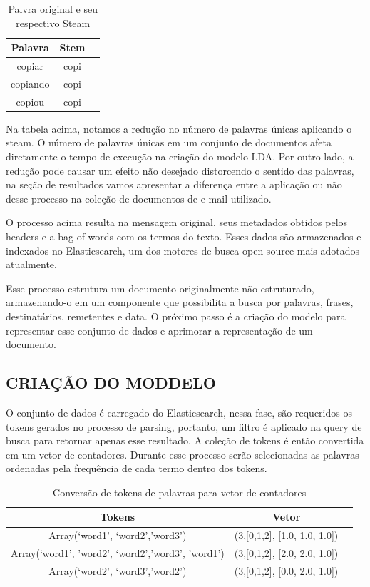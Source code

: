 \documentclass[12pt,a4paper]{article}
\begin{document}
\begin{enumerate}
  
  \begin{table}[h]
    \centering
    \begin{tabular}{c c c}
    Palavra		&Stem &\\
    \hline
    copiar		&copi &\\
    copiando		&copi &\\
    copiou		&copi &\\
    \hline
    \end{tabular}
    \caption{Palvra original e seu respectivo Steam}
  \end{table}
  
  Na tabela acima, notamos a redução no número de palavras únicas aplicando o steam. O número de palavras únicas em um conjunto de documentos afeta diretamente o tempo de execução na criação do modelo LDA. Por outro lado, a redução pode causar um efeito não desejado distorcendo o sentido das palavras, na seção de resultados vamos apresentar a diferença entre a aplicação ou não desse processo na coleção de documentos de e-mail utilizado.
  \end{enumerate}
  
  O processo acima resulta na mensagem original, seus metadados obtidos pelos headers e a bag of words com os termos do texto. Esses dados são armazenados e indexados no Elasticsearch, um dos motores de busca open-source mais adotados atualmente.
  
    Esse processo estrutura um documento originalmente não estruturado, armazenando-o em um componente que possibilita a busca por palavras, frases, destinatários, remetentes e data. O próximo passo é a criação do modelo para representar esse conjunto de dados e aprimorar a representação de um documento.
  
  
  
  \subsection{CRIAÇÃO DO MODDELO}
  O conjunto de dados é carregado do Elasticsearch, nessa fase, são requeridos os tokens gerados no processo de parsing, portanto, um filtro é aplicado na query de busca para retornar apenas esse resultado. A coleção de tokens é então convertida em um vetor de contadores. Durante esse processo serão selecionadas as palavras ordenadas pela frequência de cada termo dentro dos tokens.
  
  
  \begin{table}[h]
    \centering
    \begin{tabular}{c c c}
    Tokens		&Vetor &\\
    \hline
    Array(‘word1’, ‘word2’,’word3’)						&(3,[0,1,2], [1.0, 1.0, 1.0]) &\\
    Array(‘word1’, ’word2’, ‘word2’,’word3’, ’word1’)		&(3,[0,1,2], [2.0, 2.0, 1.0]) &\\
    Array(‘word2’, ‘word3’,’word2’)						&(3,[0,1,2], [0.0, 2.0, 1.0]) &\\
    \hline
    \end{tabular}
    \caption{Conversão de tokens de palavras para vetor de contadores}
  \end{table}
  
\end{document}
